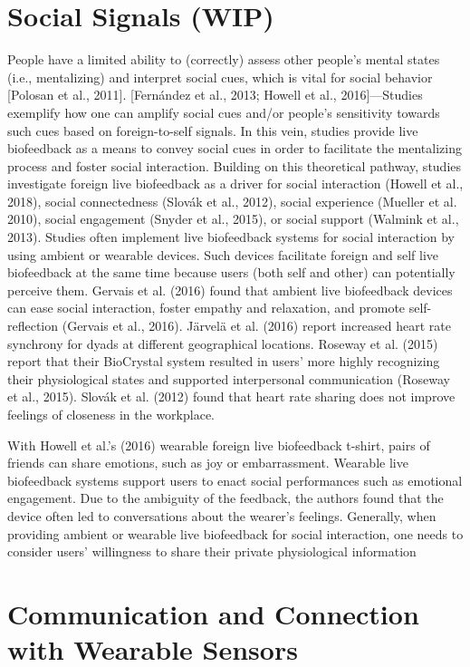 \section{Social Signals (WIP)}
People have a limited ability to (correctly) assess other people’s mental states (i.e., mentalizing) and interpret social cues, which is vital for social behavior [Polosan et al., 2011]. [Fernández et al., 2013; Howell et al., 2016]—Studies exemplify how one can amplify social cues and/or people’s sensitivity towards such cues based on foreign-to-self signals. In this vein, studies provide live biofeedback as a means to convey social cues in order to facilitate the mentalizing process and foster social interaction. Building on this theoretical pathway, studies investigate foreign live biofeedback as a driver for social interaction (Howell et al., 2018), social connectedness (Slovák et al., 2012), social experience (Mueller et al. 2010), social engagement (Snyder et al., 2015), or social support (Walmink et al., 2013). Studies often implement live biofeedback systems for social interaction by using ambient or wearable devices. Such devices facilitate foreign and self live biofeedback at the same time because users (both self and other) can potentially perceive them. Gervais et al. (2016) found that ambient live biofeedback devices can ease social interaction, foster empathy and relaxation, and promote self-reflection (Gervais et
al., 2016). Järvelä et al. (2016) report increased heart rate synchrony for dyads at different geographical locations. Roseway et al. (2015) report that their BioCrystal system resulted in users’ more highly recognizing their physiological states and supported interpersonal communication (Roseway et al., 2015). Slovák et al. (2012) found that heart rate sharing does not improve feelings of closeness in the workplace.

With Howell et al.’s (2016) wearable foreign live biofeedback t-shirt, pairs of friends can share emotions, such as joy or embarrassment. Wearable live biofeedback systems support users to enact social performances such as emotional engagement. Due to the ambiguity of the feedback, the authors found that the device often led to conversations about the wearer’s feelings. Generally, when providing ambient or wearable live biofeedback for social interaction, one  needs to consider users’ willingness to share their private physiological information 

\section{Communication and Connection with Wearable Sensors}
\label{lit_review:biosignals_sharing}

